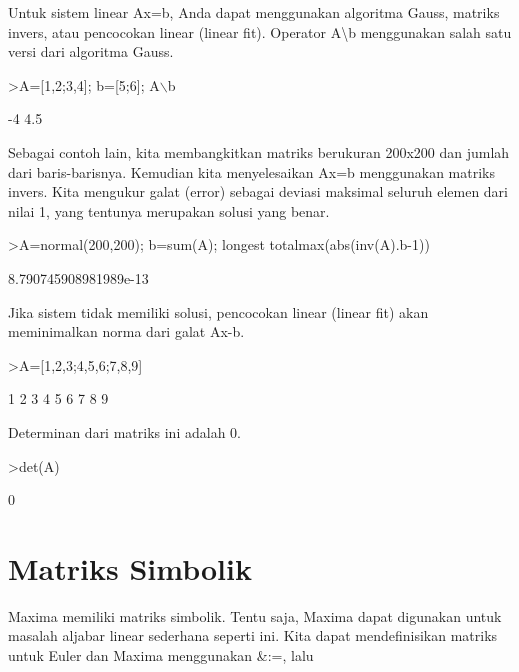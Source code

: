 \documentclass{article}
\newenvironment{eulernotebook}{\par}{\par}
\newcommand{\eulerheading}[1]{\section{#1}}
\newenvironment{eulercomment}{\par\medskip}{\par\medskip}
\begin{document}
\begin{eulernotebook}
\begin{eulercomment}
\begin{eulercomment}
\begin{eulercomment}
\begin{eulercomment}
\begin{eulercomment}
\begin{eulercomment}
\begin{eulercomment}
Untuk sistem linear Ax=b, Anda dapat menggunakan algoritma Gauss,
matriks invers, atau pencocokan linear (linear fit). Operator A\textbackslash{}b
menggunakan salah satu versi dari algoritma Gauss.
\end{eulercomment}
\begin{eulerprompt}
>A=[1,2;3,4]; b=[5;6]; A\(\backslash\)b
\end{eulerprompt}
\begin{euleroutput}
             -4 
            4.5 
\end{euleroutput}
\begin{eulercomment}
Sebagai contoh lain, kita membangkitkan matriks berukuran 200x200 dan
jumlah dari baris-barisnya. Kemudian kita menyelesaikan Ax=b
menggunakan matriks invers. Kita mengukur galat (error) sebagai
deviasi maksimal seluruh elemen dari nilai 1, yang tentunya merupakan
solusi yang benar.
\end{eulercomment}
\begin{eulerprompt}
>A=normal(200,200); b=sum(A); longest totalmax(abs(inv(A).b-1))
\end{eulerprompt}
\begin{euleroutput}
    8.790745908981989e-13 
\end{euleroutput}
\begin{eulercomment}
Jika sistem tidak memiliki solusi, pencocokan linear (linear fit) akan
meminimalkan norma dari galat Ax-b.
\end{eulercomment}
\begin{eulerprompt}
>A=[1,2,3;4,5,6;7,8,9]
\end{eulerprompt}
\begin{euleroutput}
              1             2             3 
              4             5             6 
              7             8             9 
\end{euleroutput}
\begin{eulercomment}
Determinan dari matriks ini adalah 0.
\end{eulercomment}
\begin{eulerprompt}
>det(A)
\end{eulerprompt}
\begin{euleroutput}
  0
\end{euleroutput}
\eulerheading{Matriks Simbolik}
\begin{eulercomment}
Maxima memiliki matriks simbolik. Tentu saja, Maxima dapat digunakan
untuk masalah aljabar linear sederhana seperti ini. Kita dapat
mendefinisikan matriks untuk Euler dan Maxima menggunakan \&:=, lalu

\end{eulercomment}
\end{eulercomment}
\end{eulercomment}
\end{eulercomment}
\end{eulercomment}
\end{eulercomment}
\end{eulercomment}
\end{eulernotebook}
\end{document}
